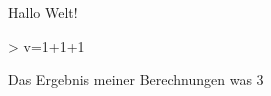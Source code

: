 \documentclass{article}
\begin{document}
Hallo Welt!

\begin{Schunk}
\begin{Sinput}
> v=1+1+1
\end{Sinput}
\end{Schunk}


Das Ergebnis meiner Berechnungen was 3
\end{document}
